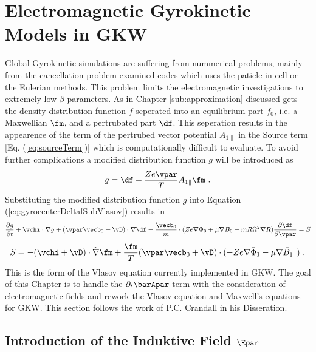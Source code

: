 \newpage
\section{Electromagnetic Gyrokinetic Models in GKW}
\label{sec:electromagnetic}

Global Gyrokinetic simulations are suffering from nummerical problems, mainly from the cancellation problem examined codes which uses the paticle-in-cell or the Eulerian methods. \source This problem limits the electromagnetic investigations to extremely low $\beta$ parameters. As in Chapter \ref{sub:approximation} discussed gets the density distribution function $f$ seperated into an equilibrium part $f_0$, i.e. a Maxwellian $\fm$, and a pertrubated part $\df$. This seperation results in the appearence of the term of the pertrubed vector potential $\bar{A}_{1 \parallel}$ in the Source term [Eq. (\ref{eq:sourceTerm})] which is computationally difficult to evaluate. To avoid further complications a modified distribution function $g$ will be introduced as
\begin{gather}
	g = \df + \frac{Ze \vpar}{T} \bar{A}_{1\parallel} \fm ~.
	\label{eq:modifiedDistrubutionFunction}
\end{gather}
Substituting the modified distribution function $g$ into Equation (\ref{eq:gyrocenterDeltafSubVlasov}) results in
\begin{gather}
	\frac{\partial g}{\partial t} + \vchi \cdot \nabla g + (\vpar \vecb_0 + \vD) \cdot \nabla \df - \frac{\vecb_0}{m} \cdot (Z e \nabla \Phi_0 + \mu \nabla B_0 - m R \Omega^2 \nabla R) \frac{\partial \df}{\partial \vpar} = S
	\label{eq:modifiedGyrocenterDeltafSubVlasov}
\end{gather}
\begin{gather}
	S = - (\vchi + \vD) \cdot \tilde{\nabla} \fm + \frac{\fm}{T} (\vpar \vecb_0 + \vD) \cdot (-Ze \nabla \bar{\Phi}_1 - \mu \nabla \bar{B}_{1\parallel}) ~.
	\label{eq:modifiedSourceTerm}
\end{gather}
This is the form of the Vlasov equation currently implemented in GKW\source. The goal of this Chapter is to handle the $\partial_t \barApar$ term with the consideration of electromagnetic fields and rework the Vlasov equation and Maxwell's equations for GKW. This section follows the work of P.C. Crandall in his Disseration\cite{Crandall_PHD}.

\subsection{Introduction of the Induktive Field $\Epar$}
\label{sub:eparallel}

